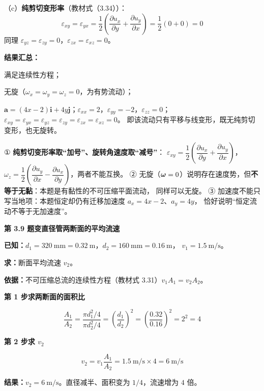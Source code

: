 \begin{jie}
（c）\textbf{纯剪切变形率}（教材式（3.34））：
\[ \varepsilon_{xy}=\varepsilon_{yx}=\frac{1}{2}\left(\frac{\partial u_x}{\partial y}
   +\frac{\partial u_y}{\partial x}\right)=\frac{1}{2}(0+0)=0 \]
同理 $\varepsilon_{yz}=\varepsilon_{zy}=0$，$\varepsilon_{zx}=\varepsilon_{xz}=0$。

\textbf{结果汇总：}
\begin{xiaowen}
\item 满足连续性方程；
\item 无旋（$\omega_x=\omega_y=\omega_z=0$，为有势流动）；
\item $\bm a=(4x-2)\bm{i}+4y\bm{j}$；$\varepsilon_{xx}=2$，$\varepsilon_{yy}=-2$，$\varepsilon_{zz}=0$；
$\varepsilon_{xy}=\varepsilon_{yx}=\varepsilon_{yz}=\varepsilon_{zy}=\varepsilon_{zx}=\varepsilon_{xz}=0$。
即该流动只有平移与线变形，既无纯剪切变形，也无旋转。
\end{xiaowen}
\end{jie}

\begin{yicuo}
① \textbf{纯剪切变形率取“加号”、旋转角速度取“减号”}：
$\varepsilon_{xy}=\dfrac{1}{2}\left(\dfrac{\partial u_x}{\partial y}+\dfrac{\partial u_y}{\partial x}\right)$，
$\omega_z=\dfrac{1}{2}\left(\dfrac{\partial u_y}{\partial x}-\dfrac{\partial u_x}{\partial y}\right)$，两者不能互换。
② 无旋（$\bm{\omega}=0$）说明存在速度势，但\textbf{不等于无黏}：本题是有黏性的不可压缩平面流动，
同样可以无旋。
③ 加速度不能只写当地项：本题恒定却仍有迁移加速度 $a_x=4x-2$、$a_y=4y$，
恰好说明“恒定流动不等于无加速度”。
\end{yicuo}

\noindent\textbf{第 3.9 题\quad 变直径管两断面的平均流速}

\begin{jie}
\textbf{已知：}$d_1=320\ \mathrm{mm}=0.32\ \mathrm{m}$，$d_2=160\ \mathrm{mm}=0.16\ \mathrm{m}$，
$v_1=1.5\ \mathrm{m/s}$。

\textbf{求：}断面平均流速 $v_2$。

\textbf{依据：}不可压缩总流的连续性方程（教材式 3.31）$v_1A_1=v_2A_2$。

\textbf{第 1 步\quad 求两断面的面积比}

\[ \frac{A_1}{A_2}=\frac{\pi d_1^2/4}{\pi d_2^2/4}=\left(\frac{d_1}{d_2}\right)^2
   =\left(\frac{0.32}{0.16}\right)^2=2^2=4 \]

\textbf{第 2 步\quad 求 $v_2$}

\[ v_2=v_1\frac{A_1}{A_2}=1.5\ \mathrm{m/s}\times4=6\ \mathrm{m/s} \]

\textbf{结果：}$v_2=6\ \mathrm{m/s}$。直径减半、面积变为 $1/4$，流速增为 $4$ 倍。
\end{jie}

